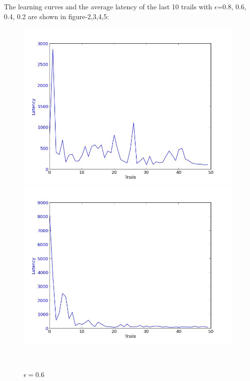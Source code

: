 \documentclass[a4paper, 11pt]{article}
\begin{document}
The learning curves and the average latency of the last 10 trails with $\epsilon$=0.8, 0.6, 0.4, 0.2 are shown in figure-2,3,4,5:

\begin{figure}
  \centering
  \begin{minipage}[c]{0.5\textwidth}
    \centering
    \includegraphics[scale=0.3]{../figure/eps8.jpeg}
      \caption{$\epsilon = 0.8$}
  \end{minipage}%
  \begin{minipage}[c]{0.5\textwidth}
    \centering
    \includegraphics[scale=0.3]{../figure/eps6.jpeg}
      \caption{$\epsilon = 0.6$}
    \end{minipage}
    \\

\end{figure}
\end{document}
